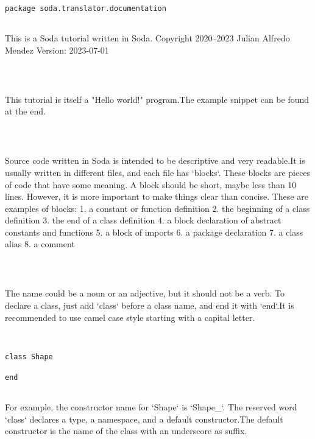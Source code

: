 \documentclass[12pt,a4paper]{article}
\begin{document}
\begin{lstlisting}
package soda.translator.documentation


\end{lstlisting}

This is a Soda tutorial written in Soda.
Copyright 2020--2023 Julian Alfredo Mendez
 Version: 2023-07-01


\begin{lstlisting}



\end{lstlisting}

 This tutorial is itself a "Hello world!" program.The example snippet can be found at the end.


\begin{lstlisting}



\end{lstlisting}

Source code written in Soda is intended to be descriptive and very readable.It is usually written in different files, and each file has `blocks`.
These blocks are pieces of code that have some meaning.
A block should be short, maybe less than 10 lines.
However, it is more important to make things clear than concise.
These are examples of blocks:
1. a constant or function definition
2. the beginning of a class definition
3. the end of a class definition
4. a block declaration of abstract constants and functions
5. a block of imports
6. a package declaration
7. a class alias
 8. a comment


\begin{lstlisting}



\end{lstlisting}

The name could be a noun or an adjective, but it should not be a verb. To declare a class, just add `class` before a class name, and end it with `end`.It is recommended to use camel case style starting with a capital letter.


\begin{lstlisting}


class Shape

end


\end{lstlisting}

For example, the constructor name for `Shape` is `Shape_`. The reserved word `class` declares a type, a namespace, and a default constructor.The default constructor is the name of the class with an underscore as suffix.
\end{document}
